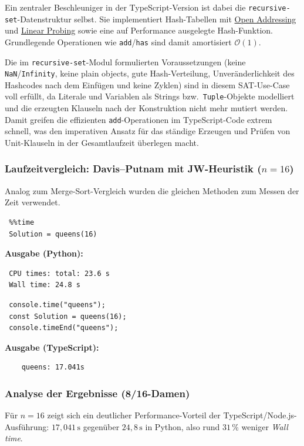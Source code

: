 Ein zentraler Beschleuniger in der TypeScript-Version ist dabei die \texttt{recursive-set}-Datenstruktur selbst. Sie implementiert Hash-Tabellen mit \href{https://en.wikipedia.org/wiki/Open_addressing}{Open Addressing} und \href{https://en.wikipedia.org/wiki/Linear_probing}{Linear Probing} sowie eine auf Performance ausgelegte Hash-Funktion. Grundlegende Operationen wie \texttt{add}/\texttt{has} sind damit amortisiert $\mathcal{O}(1)$. 

Die im \texttt{recursive-set}-Modul formulierten Voraussetzungen (keine \texttt{NaN}/\texttt{Infinity}, keine plain objects, gute Hash-Verteilung, Unveränderlichkeit des Hashcodes nach dem Einfügen und keine Zyklen) sind in diesem SAT-Use-Case voll erfüllt, da Literale und Variablen als Strings bzw.\ \texttt{Tuple}-Objekte modelliert und die erzeugten Klauseln nach der Konstruktion nicht mehr mutiert werden. Damit greifen die effizienten \texttt{add}-Operationen im TypeScript-Code extrem schnell, was den imperativen Ansatz für das ständige Erzeugen und Prüfen von Unit-Klauseln in der Gesamtlaufzeit überlegen macht.


\subsubsection{Laufzeitvergleich: Davis--Putnam mit JW-Heuristik (\(n=16\))}
Analog zum Merge-Sort-Vergleich wurden die gleichen Methoden zum Messen der Zeit verwendet.

\begin{verbatim}
 %%time
 Solution = queens(16)
\end{verbatim}
\caption{Zeitmessung in Python (16-Damen)}

\textbf{Ausgabe (Python):}
\begin{verbatim}
 CPU times: total: 23.6 s
 Wall time: 24.8 s
\end{verbatim}

\begin{verbatim}
 console.time("queens");
 const Solution = queens(16);
 console.timeEnd("queens");
\end{verbatim}
\caption{Zeitmessung in TypeScript (16-Damen)}

\textbf{Ausgabe (TypeScript):}
\begin{verbatim}
	queens: 17.041s
\end{verbatim}


\subsubsection{Analyse der Ergebnisse (8/16-Damen)}
Für \(n=16\) zeigt sich ein deutlicher Performance-Vorteil der TypeScript/Node.js-Ausführung: \(17{,}041\,\mathrm{s}\) gegenüber \(24{,}8\,\mathrm{s}\) in Python, also rund \(31\,\%\) weniger \emph{Wall time}. 

